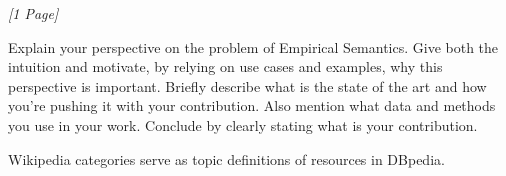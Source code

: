 \textit{[1 Page]}

\noindent
Explain your perspective on the problem of Empirical Semantics. 
Give both the intuition and motivate, by relying on use cases and examples, why this perspective is important. 
Briefly describe what is the state of the art and how you’re pushing it with your contribution. 
Also mention what data and methods you use in your work. 
Conclude by clearly stating what is your contribution.

Wikipedia categories serve as topic definitions of resources in DBpedia.
